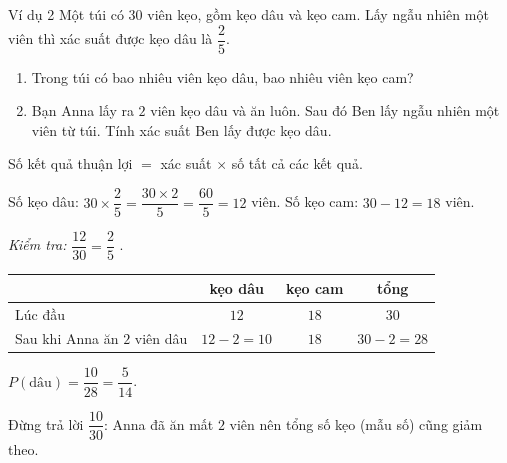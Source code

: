 \begin{exbox}{Ví dụ 2}
Một túi có $30$ viên kẹo, gồm kẹo dâu và kẹo cam. Lấy ngẫu nhiên một viên thì xác suất được kẹo dâu là $\dfrac25$.
\begin{enumerate}[label=\alph*),leftmargin=1.5em,itemsep=0pt,topsep=2pt]
\item Trong túi có bao nhiêu viên kẹo dâu, bao nhiêu viên kẹo cam?
\item Bạn Anna lấy ra $2$ viên kẹo dâu và ăn luôn. Sau đó Ben lấy ngẫu nhiên một viên từ túi. Tính xác suất Ben lấy được kẹo dâu.
\end{enumerate}
\guide
{}
\begin{recallbox}Số kết quả thuận lợi $=$ xác suất $\times$ số tất cả các kết quả.\end{recallbox}
Số kẹo dâu: $30\times\dfrac25=\dfrac{30\times 2}{5}=\dfrac{60}{5}=12$ viên. Số kẹo cam: $30-12=18$ viên.

\emph{Kiểm tra:} $\dfrac{12}{30}=\dfrac{2}{5}$ \checkmark.
\begin{center}
\begin{tabular}{|l|c|c|c|}\hline
 & kẹo dâu & kẹo cam & tổng \\ \hline
Lúc đầu & $12$ & $18$ & $30$\\ \hline
Sau khi Anna ăn $2$ viên dâu & $12-2=10$ & $18$ & $30-2=28$\\ \hline
\end{tabular}
\end{center}
$P(\text{dâu})=\dfrac{10}{28}=\dfrac{5}{14}$.
\begin{warnbox}Đừng trả lời $\dfrac{10}{30}$: Anna đã ăn mất $2$ viên nên tổng số kẹo (mẫu số) cũng giảm theo.\end{warnbox}
\end{exbox}

